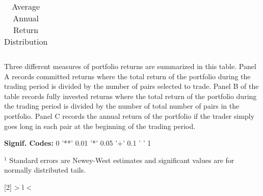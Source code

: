 \documentclass[12pt]{report}
\begin{document}
\begin{table}[hp]
\begin{tabular}{l r r l r r r r r r}
        \vspace{-1mm} \\
        \hline
    \end{tabular}
    \caption{Average Annual Return Distribution}
    \begin{tablenotes}
        \item{\footnotesize Three different measures of portfolio returns are summarized in this table. Panel A records committed returns where the total return of the portfolio during the trading period is divided by the number of pairs selected to trade. Panel B of the table records fully invested returns where the total return of the portfolio during the trading period is divided by the number of total number of pairs in the portfolio. Panel C records the annual return of the portfolio if the trader simply goes long in each pair at the beginning of the trading period.}
        \item{\footnotesize \textbf{Signif. Codes:} 0 '**' 0.01 '*' 0.05 '+' 0.1 ' ' 1}
        \item{\footnotesize $^{1}$ Standard errors are Newey-West estimates and significant values are for normally distributed tails.} 
    \end{tablenotes}
    \label{tbl:PairsTradingReturns}
\end{table}


\newcolumntype{R}[2]{%
    >{\bgroup}%
    l%
    <{\egroup}%
}
\newcommand*\rot{\multicolumn{1}{R{30}{1em}}}%
\end{document}
